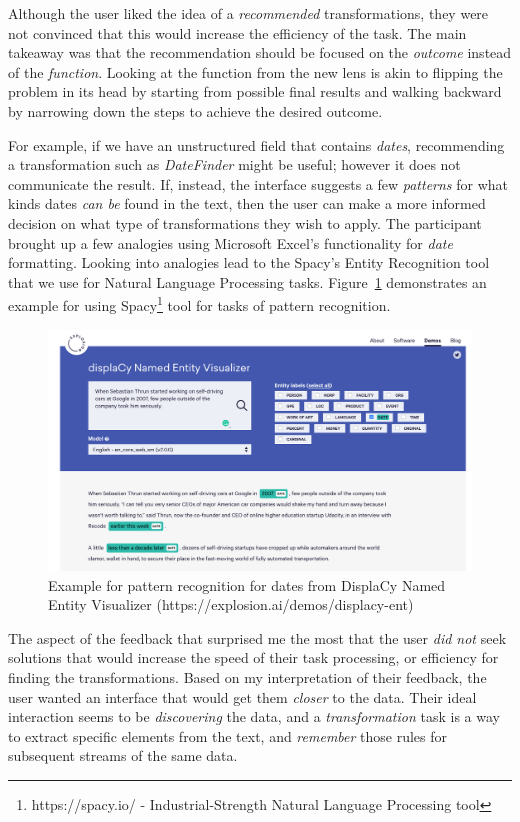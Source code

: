 \documentclass[12pt,letterpaper]{article}
\begin{document}
Although the user liked the idea of a \textit{recommended} transformations, they were not convinced that this would increase the efficiency of the task. The main takeaway was that the recommendation should be focused on the \textit{outcome} instead of the \textit{function}. Looking at the function from the new lens is akin to flipping the problem in its head by starting from possible final results and walking backward by narrowing down the steps to achieve the desired outcome. 

For example, if we have an unstructured field that contains \textit{dates}, recommending a transformation such as \textit{DateFinder} might be useful; however it does not communicate the result. If, instead, the interface suggests a few \textit{patterns} for what kinds dates \textit{can be} found in the text, then the user can make a more informed decision on what type of transformations they wish to apply. The participant brought up a few analogies using Microsoft Excel's functionality for \textit{date} formatting. Looking into analogies lead to the Spacy's Entity Recognition tool that we use for Natural Language Processing tasks. Figure~\ref{fig::1} demonstrates an example for using Spacy\footnote{https://spacy.io/ - Industrial-Strength
Natural Language Processing tool} tool for tasks of pattern recognition. 

\begin{figure}[h]
\centering
\includegraphics[scale=.15]{figures/m3/spacy_date_finder.png}
\caption{Example for pattern recognition for dates from DisplaCy Named Entity Visualizer (https://explosion.ai/demos/displacy-ent)}
\label{fig::1}
\end{figure}

The aspect of the feedback that surprised me the most that the user \textit{did not} seek solutions that would increase the speed of their task processing, or efficiency for finding the transformations. Based on my interpretation of their feedback, the user wanted an interface that would get them \textit{closer} to the data. Their ideal interaction seems to be \textit{discovering} the data, and a \textit{transformation} task is a way to extract specific elements from the text, and \textit{remember} those rules for subsequent streams of the same data.  
\end{document}
